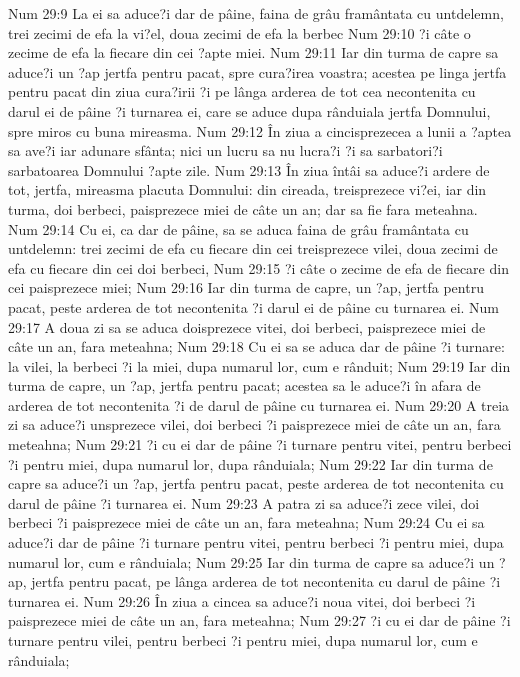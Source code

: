 Num 29:9  La ei sa aduce?i dar de pâine, faina de grâu framântata cu untdelemn, trei zecimi de efa la vi?el, doua zecimi de efa la berbec
Num 29:10  ?i câte o zecime de efa la fiecare din cei ?apte miei.
Num 29:11  Iar din turma de capre sa aduce?i un ?ap jertfa pentru pacat, spre cura?irea voastra; acestea pe linga jertfa pentru pacat din ziua cura?irii ?i pe lânga arderea de tot cea necontenita cu darul ei de pâine ?i turnarea ei, care se aduce dupa rânduiala jertfa Domnului, spre miros cu buna mireasma.
Num 29:12  În ziua a cincisprezecea a lunii a ?aptea sa ave?i iar adunare sfânta; nici un lucru sa nu lucra?i ?i sa sarbatori?i sarbatoarea Domnului ?apte zile.
Num 29:13  În ziua întâi sa aduce?i ardere de tot, jertfa, mireasma placuta Domnului: din cireada, treisprezece vi?ei, iar din turma, doi berbeci, paisprezece miei de câte un an; dar sa fie fara meteahna.
Num 29:14  Cu ei, ca dar de pâine, sa se aduca faina de grâu framântata cu untdelemn: trei zecimi de efa cu fiecare din cei treisprezece vilei, doua zecimi de efa cu fiecare din cei doi berbeci,
Num 29:15  ?i câte o zecime de efa de fiecare din cei paisprezece miei;
Num 29:16  Iar din turma de capre, un ?ap, jertfa pentru pacat, peste arderea de tot necontenita ?i darul ei de pâine cu turnarea ei.
Num 29:17  A doua zi sa se aduca doisprezece vitei, doi berbeci, paisprezece miei de câte un an, fara meteahna;
Num 29:18  Cu ei sa se aduca dar de pâine ?i turnare: la vilei, la berbeci ?i la miei, dupa numarul lor, cum e rânduit;
Num 29:19  Iar din turma de capre, un ?ap, jertfa pentru pacat; acestea sa le aduce?i în afara de arderea de tot necontenita ?i de darul de pâine cu turnarea ei.
Num 29:20  A treia zi sa aduce?i unsprezece vilei, doi berbeci ?i paisprezece miei de câte un an, fara meteahna;
Num 29:21  ?i cu ei dar de pâine ?i turnare pentru vitei, pentru berbeci ?i pentru miei, dupa numarul lor, dupa rânduiala;
Num 29:22  Iar din turma de capre sa aduce?i un ?ap, jertfa pentru pacat, peste arderea de tot necontenita cu darul de pâine ?i turnarea ei.
Num 29:23  A patra zi sa aduce?i zece vilei, doi berbeci ?i paisprezece miei de câte un an, fara meteahna;
Num 29:24  Cu ei sa aduce?i dar de pâine ?i turnare pentru vitei, pentru berbeci ?i pentru miei, dupa numarul lor, cum e rânduiala;
Num 29:25  Iar din turma de capre sa aduce?i un ?ap, jertfa pentru pacat, pe lânga arderea de tot necontenita cu darul de pâine ?i turnarea ei.
Num 29:26  În ziua a cincea sa aduce?i noua vitei, doi berbeci ?i paisprezece miei de câte un an, fara meteahna;
Num 29:27  ?i cu ei dar de pâine ?i turnare pentru vilei, pentru berbeci ?i pentru miei, dupa numarul lor, cum e rânduiala;
